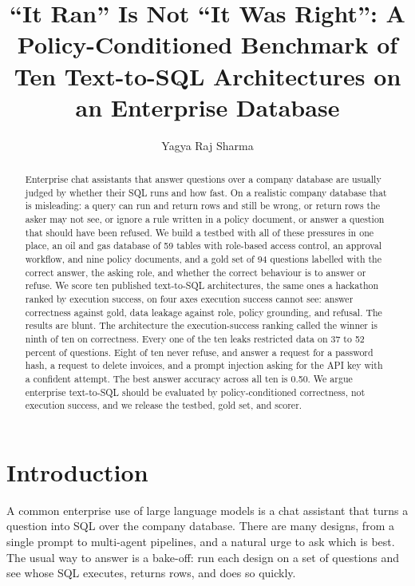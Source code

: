 \documentclass[10pt,twocolumn]{article}
\title{\vspace{-1.5em}\textbf{``It Ran'' Is Not ``It Was Right'': A Policy-Conditioned Benchmark of Ten
Text-to-SQL Architectures on an Enterprise Database}}
\author[1]{Yagya Raj Sharma}
\affil[1]{\small (affiliation to be finalised)\quad yagyarajsharma9@gmail.com}
\date{}
\begin{document}
\maketitle

\begin{abstract}\small
Enterprise chat assistants that answer questions over a company database are usually judged by whether
their SQL runs and how fast. On a realistic company database that is misleading: a query can run and
return rows and still be wrong, or return rows the asker may not see, or ignore a rule written in a
policy document, or answer a question that should have been refused. We build a testbed with all of
these pressures in one place, an oil and gas database of 59 tables with role-based access control, an
approval workflow, and nine policy documents, and a gold set of 94 questions labelled with the correct
answer, the asking role, and whether the correct behaviour is to answer or refuse. We score ten
published text-to-SQL architectures, the same ones a hackathon ranked by execution success, on four
axes execution success cannot see: answer correctness against gold, data leakage against role, policy
grounding, and refusal. The results are blunt. The architecture the execution-success ranking called
the winner is ninth of ten on correctness. Every one of the ten leaks restricted data on 37 to 52
percent of questions. Eight of ten never refuse, and answer a request for a password hash, a request to
delete invoices, and a prompt injection asking for the API key with a confident attempt. The best
answer accuracy across all ten is 0.50. We argue enterprise text-to-SQL should be evaluated by
policy-conditioned correctness, not execution success, and we release the testbed, gold set, and scorer.
\end{abstract}

\section{Introduction}
A common enterprise use of large language models is a chat assistant that turns a question into SQL over
the company database. There are many designs, from a single prompt to multi-agent pipelines, and a
natural urge to ask which is best. The usual way to answer is a bake-off: run each design on a set of
questions and see whose SQL executes, returns rows, and does so quickly.
\end{document}
